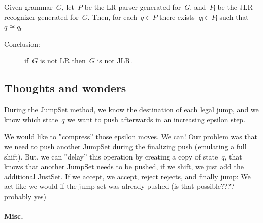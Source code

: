 \begin{Lemma}
  Given grammar~$G$, let~$P$ be the LR parser generated for~$G$, and~$Pⱼ$ be
  the JLR recognizer generated for~$G$.
  Then, for each~$q∈P$ there exists~$qⱼ∈Pⱼ$ such that~$q≅qⱼ$.
\end{Lemma}
\begin{description}
  \item[Conclusion:] if~$G$ is not LR then~$G$ is not JLR.
\end{description}

\subsection{Thoughts and wonders}

During the JumpSet method, we know the destination of each legal jump,
and we know which state~$q$ we want to push afterwards in an increasing epsilon step.

We would like to ‟compress” those epsilon moves. We can!
Our problem was that we need to push another JumpSet during the finalizing push (emulating a full shift).
But, we can ‟delay” this operation by creating a copy of state~$q$, that knows that another JumpSet needs to be
pushed, if we shift, we just add the additional JustSet. If we accept, we accept, reject rejects, and finally jump:
We act like we would if the jump set was already pushed (is that possible???? probably yes)
\paragraph{Misc.}

\endinput

\subsection{Between LR and JLR - A direct approach}
LR parsers are actually DPDAs\@. As we mentioned before in \cref{section:proof},~$ε$-moves
fails the emulation of a DPDA, thus, in order to type-encode an LR parser, we first need
to convert it to the encode-able jDPDA\@.

A \emph{JLR parser}, or \emph{Jump LR Parser} is an LR parser, that
is based on a variation of the jDPDA\@.
The objective of the JLR parser is refined in~\cref{theorem:JLR}.

\begin{Theorem}
  \label{theorem:JLR}
  Let~$P$ be an LR parser, then there exists a jDPDA~$J$,
  such that for every string~$α∈Σ^*$, parser~$P$ accepts~$α$
  if and only if~$J$ accepts~$α$
\end{Theorem}

